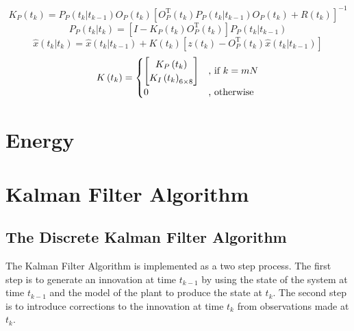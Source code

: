 \documentclass[a4paper]{report}
\numberwithin{equation}{chapter}
\begin{document}
\begin{equation}
K_P \left( t_k \right) = P_P \left( t_k | t_{k - 1} \right) O_P \left( t_k \right) \left[ O^{\mathrm{T}}_P \left( t_k \right) P_P \left( t_k | t_{k - 1} \right) O_P \left( t_k \right) + R \left( t_k \right) \right]^{-1}
\end{equation}
\begin{equation}
P_P \left( t_k | t_k \right) = \left[ I - K_P \left( t_k \right) O_P^{\mathrm{T}} \left( t_k \right) \right] P_P \left( t_k | t_{k - 1} \right)
\end{equation}
\begin{equation}
\hat{x} \left( t_k | t_k \right) = \hat{x} \left( t_k | t_{k - 1} \right) + K \left( t_k \right) \left[ z \left( t_k \right) - O_P^{\mathrm{T}} \left( t_k \right) \hat{x} \left( t_k | t_{k - 1} \right) \right]
\end{equation}
\begin{equation}
K \left( t_k \right) = 
\begin{cases}
\begin{bmatrix}
K_P \left( t_k \right)\\
K_I \left( t_k \right)_{6 \times 8}\\
\end{bmatrix}
& \text{, if $ k = mN$} \\
0 & \text{, otherwise}
\end{cases}
\end{equation}

\clearpage\setcounter{page}{1}
\chapter[Energy]{Energy}

\appendix

\clearpage\setcounter{page}{1}
\chapter[Kalman Filter Algorithm]{Kalman Filter Algorithm}

\section[The Discrete Kalman Filter Algorithm]{The Discrete Kalman Filter Algorithm}

The Kalman Filter Algorithm is implemented as a two step process. The first step is to generate an innovation at time $t_{k-1}$ by using the state of the system at time $t_{k - 1}$ and the model of the plant to produce the state at $t_k$. The second step is to introduce corrections to the innovation at time $t_k$ from observations made at $t_k$.
\end{document}
